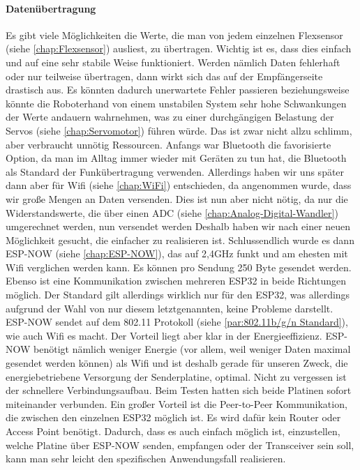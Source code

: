 \documentclass[titlepage,12pt,twoside]{article}
\begin{document}
\paragraph{Datenübertragung}
\label{par:Datenübertragung}
\hfill \break
\hfill \break
Es gibt viele Möglichkeiten die Werte, die man von jedem einzelnen Flexsensor (siehe \autoref{chap:Flexsensor}) ausliest, zu übertragen. Wichtig ist es, dass 
dies einfach und auf eine sehr stabile Weise funktioniert. Werden nämlich Daten fehlerhaft oder nur teilweise übertragen, dann 
wirkt sich das auf der Empfängerseite drastisch aus. Es könnten dadurch unerwartete Fehler passieren beziehungsweise könnte die 
Roboterhand von einem unstabilen System sehr hohe Schwankungen der Werte andauern wahrnehmen, was zu einer durchgängigen 
Belastung der Servos (siehe \autoref{chap:Servomotor}) führen würde. Das ist zwar nicht allzu schlimm, aber verbraucht unnötig Ressourcen. Anfangs war Bluetooth 
die favorisierte Option, da man im Alltag immer wieder mit Geräten zu tun hat, die Bluetooth als Standard der Funkübertragung 
verwenden. Allerdings haben wir uns später dann aber für Wifi (siehe \autoref{chap:WiFi}) entschieden, da angenommen wurde, dass wir große Mengen an Daten 
versenden. Dies ist nun aber nicht nötig, da nur die Widerstandswerte, die über einen ADC (siehe \autoref{chap:Analog-Digital-Wandler}) umgerechnet werden, nun versendet 
werden Deshalb haben wir nach einer neuen Möglichkeit gesucht, die einfacher zu realisieren ist. Schlussendlich wurde es dann 
ESP-NOW (siehe \autoref{chap:ESP-NOW}), das auf 2,4GHz funkt und am ehesten mit Wifi verglichen werden kann. Es können pro Sendung 250 Byte gesendet werden. 
Ebenso ist eine Kommunikation zwischen mehreren ESP32 in beide Richtungen möglich. Der Standard gilt allerdings wirklich nur 
für den ESP32, was allerdings aufgrund der Wahl von nur diesem letztgenannten, keine Probleme darstellt. ESP-NOW sendet auf dem 
802.11 Protokoll (siehe \autoref{par:802.11b/g/n Standard}), wie auch Wifi es macht. Der Vorteil liegt aber klar in der Energieeffizienz. ESP-NOW benötigt nämlich weniger 
Energie (vor allem, weil weniger Daten maximal gesendet werden können) als Wifi und ist deshalb gerade für unseren Zweck, die 
energiebetriebene Versorgung der Senderplatine, optimal. Nicht zu vergessen ist der schnellere Verbindungsaufbau. Beim Testen 
hatten sich beide Platinen sofort miteinander verbunden. Ein großer Vorteil ist die Peer-to-Peer Kommunikation, die zwischen 
den einzelnen ESP32 möglich ist. Es wird dafür kein Router oder Access Point benötigt. Dadurch, dass es auch einfach möglich 
ist, einzustellen, welche Platine über ESP-NOW senden, empfangen oder der Transceiver sein soll, kann man sehr leicht den 
spezifischen Anwendungsfall realisieren. \\
\\
\end{document}
